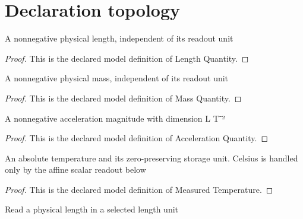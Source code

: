 \section{Declaration topology}
\begin{definition}
  \label{def:physics:phyx-mini-0484:phyxminiproblems-problemphyxmini0484-lengthquantity}
  A nonnegative physical length, independent of its readout unit
\end{definition}
\begin{proof}
  This is the declared model definition of Length Quantity.
\end{proof}
\begin{definition}
  \label{def:physics:phyx-mini-0484:phyxminiproblems-problemphyxmini0484-massquantity}
  A nonnegative physical mass, independent of its readout unit
\end{definition}
\begin{proof}
  This is the declared model definition of Mass Quantity.
\end{proof}
\begin{definition}
  \label{def:physics:phyx-mini-0484:phyxminiproblems-problemphyxmini0484-accelerationquantity}
  A nonnegative acceleration magnitude with dimension L T⁻²
\end{definition}
\begin{proof}
  This is the declared model definition of Acceleration Quantity.
\end{proof}
\begin{definition}
  \label{def:physics:phyx-mini-0484:phyxminiproblems-problemphyxmini0484-measuredtemperature}
  An absolute temperature and its zero-preserving storage unit. Celsius is handled only by the affine scalar readout below
\end{definition}
\begin{proof}
  This is the declared model definition of Measured Temperature.
\end{proof}
\begin{definition}
  \label{def:physics:phyx-mini-0484:phyxminiproblems-problemphyxmini0484-lengthreadout}
  Read a physical length in a selected length unit
\end{definition}
